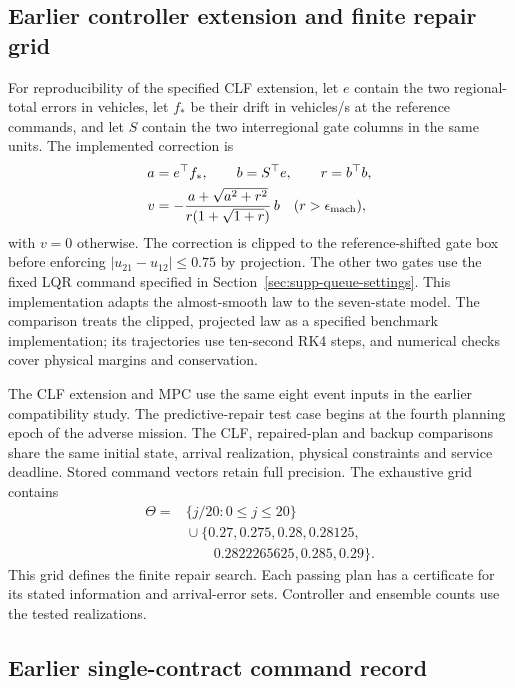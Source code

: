 \documentclass[preprint,12pt]{elsarticle}
\numberwithin{equation}{section}
\begin{document}
\subsection{Earlier controller extension and finite repair grid}
\label{app:benchmark-details}
For reproducibility of the specified CLF extension, let $e$ contain the two
regional-total errors in vehicles, let $f_*$ be their drift in vehicles/s
at the reference commands, and let $S$ contain the two interregional gate
columns in the same units. The implemented correction is
\[
\begin{aligned}
a&=e^\top f_*,\qquad b=S^\top e,\qquad r=b^\top b,\\
v&=-\frac{a+\sqrt{a^2+r^2}}{r(1+\sqrt{1+r})}\,b
\quad (r>\epsilon_{\rm mach}),
\end{aligned}
\]
with $v=0$ otherwise. The correction is clipped to the reference-shifted
gate box before enforcing $|u_{21}-u_{12}|\le0.75$ by projection. The
other two gates use the fixed LQR command specified in
Section~\ref{sec:supp-queue-settings}. This implementation adapts the
almost-smooth law to the seven-state model. The comparison treats the clipped,
projected law as a specified benchmark implementation; its trajectories use
ten-second RK4 steps, and numerical checks cover physical margins and
conservation.

The CLF extension and MPC use the same eight event inputs in the earlier compatibility study. The
predictive-repair test case begins at the fourth planning epoch of the
adverse mission. The CLF, repaired-plan and backup comparisons share
the same initial state, arrival realization, physical constraints and
service deadline. Stored command vectors retain full precision.
The exhaustive grid contains
\[
\begin{aligned}
\Theta={}&\{j/20:0\le j\le20\}\\
&{}\cup\{0.27,0.275,0.28,0.28125,\\
&\hspace{2em}0.2822265625,0.285,0.29\}.
\end{aligned}
\]
This grid defines the finite repair search. Each passing plan has a
certificate for its stated information and arrival-error sets.
Controller and ensemble counts use the tested realizations.

\subsection{Earlier single-contract command record}
\end{document}
